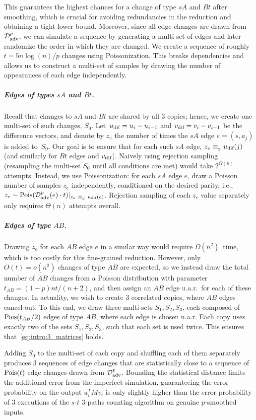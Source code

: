 \documentclass[letter,11pt]{article}
\newcommand{\paths}[3]{${#1}$-${#2}$ ${#3}$-paths\xspace}
\newcommand{\advdist}{\mathcal{D}_\textnormal{adv}}
\newcommand{\udif}{{u_\textnormal{dif}}}
\newcommand{\vdif}{v_\textnormal{dif}}
\newcommand{\roundnumber}{{t}}
\begin{document}
This guarantees the highest chances for a change of type $sA$ and $Bt$ after smoothing, 
which is crucial for avoiding redundancies in the reduction and obtaining a tight lower bound.
Moreover, since all edge changes are drawn from $\advdist^p$, we can simulate a sequence by generating a multi-set of edges and later randomize the order in which they are changed.
We create a sequence of roughly $\roundnumber = 5 n \log(n) / p$ changes using Poissonization.
This breaks dependencies and allows us to construct a multi-set of samples by drawing the number of appearances of each edge independently.


\subparagraph{Edges of types $sA$ and $Bt$.}
Recall that changes to $sA$ and $Bt$ are shared by all $3$ copies; hence, we create one multi-set of such changes, $S_0$. 
Let~$\udif=u_i-u_{i-1}$ and $\vdif=v_i-v_{i-1}$ be the difference vectors, and denote by $z_e$ the number of times the $sA$ edge $e=(s,a_j)$ is added to~$S_0$. 
Our goal is to ensure that for each such $sA$ edge, $z_e \sameparity \udif(j)$ (and similarly for $Bt$ edges and $\vdif$).
Naively using
rejection sampling (resampling the multi-set $S_0$ until all conditions are met) would take $2^{\Omega(n)}$ attempts.
Instead, we use Poissonization:
for each $sA$ edge $e$, draw a Poisson number of samples $z_e$ independently,
conditioned on the desired parity, i.e.,  $z_e \sim \poisson{\advdist^p (e)\cdot \roundnumber} \vert_{z_e \sameparity \udif(e)}$.
Rejection sampling of each $z_e$ value separately only requires $\Theta(n)$ attempts overall.


\subparagraph{Edges of type $AB$.}
Drawing $z_e$ for each $AB$ edge $e$ in a similar way would require $\Omega\left(n^2\right)$~time, which is too costly for this fine-grained reduction. 
However, only $O(t) = o(n^2)$ changes of type $AB$ are expected, so we instead draw the total  number of $AB$ changes from a Poisson distribution with parameter $t_{AB} = (1-p)nt /(n+2)$, and then assign an $AB$ edge u.a.r.\ for each of these changes.
In actuality, we wish to create $3$ correlated copies, where $AB$ edges cancel out. 
To this end, we draw three multi-sets $S_1, S_2, S_3$, each composed of $\poisson{t_{AB}/2}$ edges of type $AB$, where each edge is chosen u.a.r.
Each copy uses exactly two of the sets $S_1, S_2, S_3$, such that each set is used twice. This ensures that~\eqref{eq:intro:3_matrices} holds.


Adding $S_0$ to the multi-set of each copy and shuffling each of them separately produces
$3$ sequences of edge changes
that are statistically close to a sequence of $\poisson{t}$ edge changes drawn from $\advdist^p$.
Bounding the statistical distance limits the additional error from the imperfect simulation, guaranteeing the error probability on the output $u_i^T M v_i$ is only slightly higher than the error probability of $3$ executions of the \paths st3 counting algorithm on genuine $p$-smoothed inputs.
\end{document}
